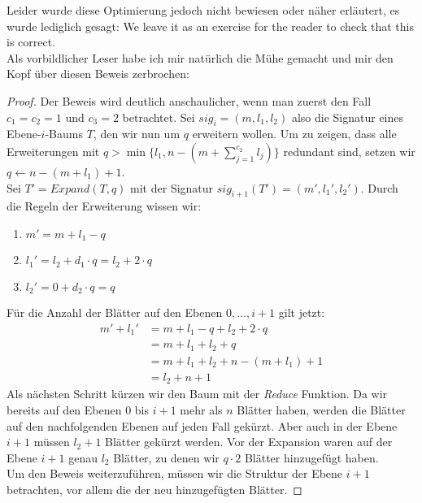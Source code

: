\documentclass[a4paper,10pt,ngerman]{scrartcl}
\begin{document}
    Leider wurde diese Optimierung jedoch nicht bewiesen oder näher erläutert, es wurde lediglich gesagt: \glqq We leave it as an exercise for the reader to check that this is correct.\grqq \\
    Als vorbildlicher Leser habe ich mir natürlich die Mühe gemacht und mir den Kopf über diesen Beweis zerbrochen:
    \begin{proof}
        Der Beweis wird deutlich anschaulicher, wenn man zuerst den Fall $c_1 = c_2 = 1$ und $c_3 = 2$ betrachtet.
        Sei $sig_i = (m, l_1, l_2)$ also die Signatur eines Ebene-$i$-Baums $T$, den wir nun um $q$ erweitern wollen.
        Um zu zeigen, dass alle Erweiterungen mit $q > \min\{l_1, n - (m + \sum^{c_2}_{j=1} l_j)\}$ redundant sind, setzen wir $q \gets n - (m + l_1) + 1$. \\
        Sei $T' = Expand(T, q)$ mit der Signatur $sig_{i+1}(T') = (m', l_1', l_2')$.
        Durch die Regeln der Erweiterung wissen wir:
        \begin{enumerate}
            \item $m' = m + l_1 - q$
            \item $l_1' = l_2 + d_1 \cdot q = l_2 + 2 \cdot q$
            \item $l_2' = 0 + d_2 \cdot q = q$
        \end{enumerate}
        Für die Anzahl der Blätter auf den Ebenen $0, \dots, i + 1$ gilt jetzt:
        \begin{equation}
            \begin{aligned}
                m'+ l_1' &= m + l_1 - q + l_2 + 2 \cdot q\\
                &= m + l_1 + l_2 + q\\
                &= m + l_1 + l_2 + n - (m + l_1) + 1\\
                &= l_2 + n + 1
            \end{aligned}\label{eq:equation}
        \end{equation}
        Als nächsten Schritt kürzen wir den Baum mit der \textit{Reduce} Funktion.
        Da wir bereits auf den Ebenen $0$ bis $i+1$ mehr als $n$ Blätter haben, werden die Blätter auf den nachfolgenden Ebenen auf jeden Fall gekürzt.
        Aber auch in der Ebene $i + 1$ müssen $l_2 + 1$ Blätter gekürzt werden.
        Vor der Expansion waren auf der Ebene $i + 1$ genau $l_2$ Blätter, zu denen wir $q \cdot 2$ Blätter hinzugefügt haben. \\
        Um den Beweis weiterzuführen, müssen wir die Struktur der Ebene $i+1$ betrachten, vor allem die der neu hinzugefügten Blätter.

\end{proof}
\end{document}
